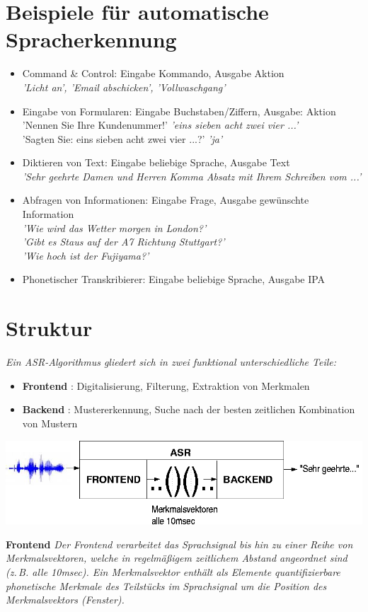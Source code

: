 \documentclass[11pt]{book}
\newcommand{\vsph}{\vspace*{0.5cm}}
\newcommand{\begi}{\begin{itemize} \setlength{\itemsep}{0.2cm}}
\newcommand{\ndit}{\end{itemize}}
\begin{document}
\section{Beispiele für automatische Spracherkennung}
\begi
\item Command \& Control: Eingabe Kommando, Ausgabe Aktion \\
{\em 'Licht an', 'Email abschicken', 'Vollwaschgang'}
\item Eingabe von Formularen: Eingabe Buchstaben/Ziffern, Ausgabe: Aktion\\
'Nennen Sie Ihre Kundenummer!'  {\em 'eins sieben acht zwei vier ...'}\\
'Sagten Sie: eins sieben acht zwei vier ...?' {\em 'ja'}
\item Diktieren von Text: Eingabe beliebige Sprache, Ausgabe Text\\
{\em 'Sehr geehrte Damen und Herren Komma Absatz mit Ihrem Schreiben vom ...'}
\item Abfragen von Informationen: Eingabe Frage, Ausgabe gew\"unschte Information\\
{\em 'Wie wird das Wetter morgen in London?'\\
'Gibt es Staus auf der A7 Richtung Stuttgart?'\\
'Wie hoch ist der Fujiyama?'}
\item Phonetischer Transkribierer: Eingabe beliebige Sprache, Ausgabe IPA
\ndit

\section{Struktur}
{\em Ein ASR-Algorithmus gliedert sich in zwei funktional 
unterschiedliche Teile:}
\vsph

\begi
\item {\bf Frontend} : Digitalisierung, Filterung, Extraktion von Merkmalen
\item {\bf Backend} : Mustererkennung, Suche nach der besten zeitlichen 
Kombination von Mustern
\ndit

\includegraphics[width=\textwidth]{grafiken/automatische-spracherkennung/struktur.png}

{\bf Frontend}
{\em Der Frontend verarbeitet das Sprachsignal bis hin zu einer 
Reihe von Merkmalsvektoren, welche in regelmäßigem zeitlichem 
Abstand angeordnet sind (z.\,B. alle 10msec). Ein Merkmalsvektor
enthält als Elemente quantifizierbare phonetische Merkmale des 
Teilstücks im Sprachsignal um die Position des Merkmalsvektors
(Fenster).}
\end{document}
